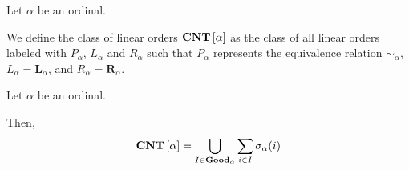 \begin{definition}
  Let $\alpha$ be an ordinal.

  We define the class of linear orders
  $\mathbf{CNT} \left[ {\alpha} \right]$ as the class of all linear orders
  labeled with $P_\alpha$, $L_\alpha$ and $R_\alpha$
  such that $P_\alpha$ represents the equivalence relation $\sim_{\alpha}$,
  $L_\alpha = \mathbf{L}_{\alpha}$, and $R_\alpha = \mathbf{R}_{\alpha}$.
\end{definition}

\begin{lemma}{\label{cnt-decomposition-single-ordinal}}
  Let $\alpha$ be an ordinal.

  Then,
  \[
    \mathbf{CNT} \left[ {\alpha} \right] = \bigcup_{I \in \mathbf{Good}_{\alpha}} \sum_{i \in I} \sigma_\alpha(i)
  \]
\end{lemma}

